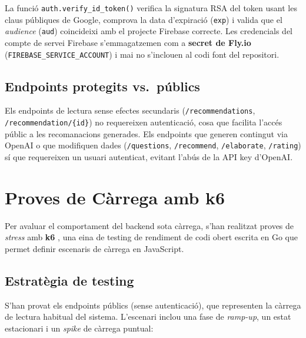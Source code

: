 \documentclass[12pt,a4paper]{article}
\begin{document}
La funció \texttt{auth.verify\_id\_token()} verifica la signatura RSA del token usant les claus públiques de Google, comprova la data d'expiració (\texttt{exp}) i valida que el \textit{audience} (\texttt{aud}) coincideixi amb el projecte Firebase correcte. Les credencials del compte de servei Firebase s'emmagatzemen com a \textbf{secret de Fly.io} (\texttt{FIREBASE\_SERVICE\_ACCOUNT}) i mai no s'inclouen al codi font del repositori.

\subsection{Endpoints protegits vs.\ públics}

Els endpoints de lectura sense efectes secundaris (\texttt{/recommendations}, \texttt{/recommendation/\{id\}}) no requereixen autenticació, cosa que facilita l'accés públic a les recomanacions generades. Els endpoints que generen contingut via OpenAI o que modifiquen dades (\texttt{/questions}, \texttt{/recommend}, \texttt{/elaborate}, \texttt{/rating}) sí que requereixen un usuari autenticat, evitant l'abús de la API key d'OpenAI.

\section{Proves de Càrrega amb k6}

Per avaluar el comportament del backend sota càrrega, s'han realitzat proves de \textit{stress} amb \textbf{k6} \cite{k6docs}, una eina de testing de rendiment de codi obert escrita en Go que permet definir escenaris de càrrega en JavaScript.

\subsection{Estratègia de testing}

S'han provat els endpoints públics (sense autenticació), que representen la càrrega de lectura habitual del sistema. L'escenari inclou una fase de \textit{ramp-up}, un estat estacionari i un \textit{spike} de càrrega puntual:
\end{document}
